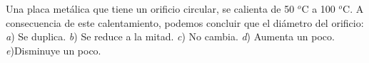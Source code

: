 
Una placa metálica que tiene un orificio circular, se calienta de 50 $^o$C a 100 $^o$C. A consecuencia de este calentamiento, podemos concluir que el diámetro del orificio:
\textit{a}) Se duplica. \textit{b}) Se reduce a la mitad. \textit{c}) No cambia. \textit{d}) Aumenta un poco. \textit{e})Disminuye un poco.
